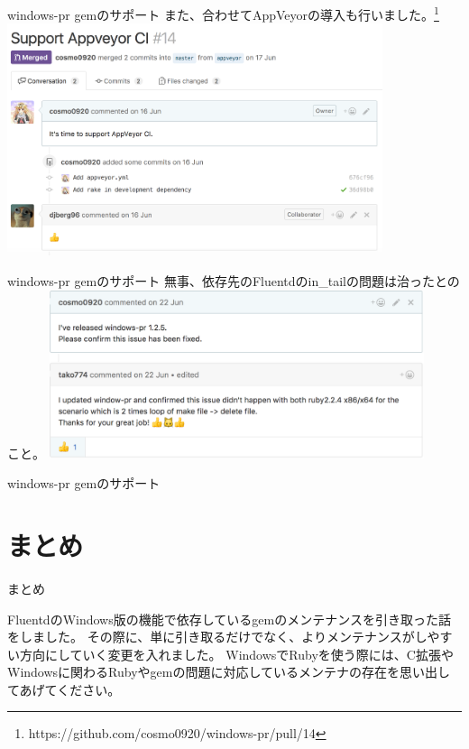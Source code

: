 \documentclass[12pt, unicode]{beamer}
\begin{document}
\begin{frame}{windows-pr gemのサポート}
  また、合わせてAppVeyorの導入も行いました。\footnote[frame]{https://github.com/cosmo0920/windows-pr/pull/14}
  \includegraphics[clip,width=11cm]{images/support_appveyor_windows-pr.png}
\end{frame}

\begin{frame}{windows-pr gemのサポート}
  無事、依存先のFluentdのin\_tailの問題は治ったとのこと。
  \includegraphics[clip,width=11cm]{images/fixed_in_tail_invalid_handle_in_windows.png}
\end{frame}

\begin{frame}{windows-pr gemのサポート}
  \Large {
  }
\end{frame}

\section[]{まとめ}
\begin{frame}{まとめ}
  \begin{block}{}
    FluentdのWindows版の機能で依存しているgemのメンテナンスを引き取った話をしました。\newline
    その際に、単に引き取るだけでなく、よりメンテナンスがしやすい方向にしていく変更を入れました。\newline
    WindowsでRubyを使う際には、C拡張やWindowsに関わるRubyやgemの問題に対応しているメンテナの存在を思い出してあげてください。
  \end{block}
\end{frame}
\end{document}
